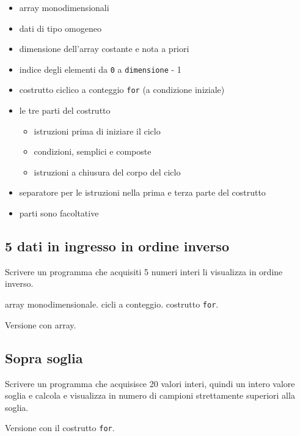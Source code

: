 \begin{itemize}
\item array monodimensionali
\item dati di tipo omogeneo
\item dimensione dell'array costante e nota a priori
\item indice degli elementi da \texttt{0} a \texttt{dimensione} - 1
\item costrutto ciclico a conteggio \texttt{for} (a condizione iniziale)
\item le tre parti del costrutto
\begin{itemize}
	\item istruzioni prima di iniziare il ciclo
	\item condizioni, semplici e composte
	\item istruzioni a chiusura del corpo del ciclo
  \end{itemize}
\item separatore per le istruzioni nella prima e terza parte del costrutto
\item parti sono facoltative
\end{itemize}

\mysep{}


\subsection{5 dati in ingresso in ordine inverso}
Scrivere un programma che acquisiti 5 numeri interi li visualizza in ordine inverso.

\begin{tags}
array monodimensionale. cicli a conteggio. costrutto \texttt{for}.
\end{tags}


Versione con array.



\subsection{Sopra soglia}
Scrivere un programma che acquisisce 20 valori interi, quindi un intero valore soglia e calcola e visualizza in numero di campioni strettamente superiori alla soglia.


Versione con il costrutto \texttt{for}.

